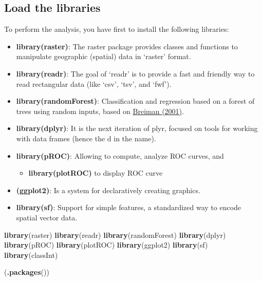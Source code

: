 \documentclass[
]{book}
\newenvironment{Shaded}{\begin{snugshade}}{\end{snugshade}}
\newcommand{\FunctionTok}[1]{\textcolor[rgb]{0.13,0.29,0.53}{\textbf{#1}}}
\newcommand{\NormalTok}[1]{#1}
\providecommand{\tightlist}{%
  \setlength{\itemsep}{0pt}\setlength{\parskip}{0pt}}
\begin{document}
\hypertarget{load-the-libraries-4}{%
\subsection{Load the libraries}\label{load-the-libraries-4}}

To perform the analysis, you have first to install the following libraries:

\begin{itemize}
\item
  \textbf{library(raster)}: The raster package provides classes and functions to manipulate geographic (spatial) data in `raster' format.
\item
  \textbf{library(readr)}: The goal of `readr' is to provide a fast and friendly way to read rectangular data (like `csv', `tsv', and `fwf').
\item
  \textbf{library(randomForest)}: Classification and regression based on a forest of trees using random inputs, based on \href{https://link.springer.com/article/10.1023/A:1010933404324}{Breiman (2001)}.
\item
  \textbf{library(dplyr)}: It is the next iteration of plyr, focused on tools for working with data frames (hence the d in the name).
\item
  \textbf{library(pROC)}: Allowing to compute, analyze ROC curves, and

  \begin{itemize}
  \tightlist
  \item
    \textbf{library(plotROC)} to display ROC curve
  \end{itemize}
\item
  \textbf{(ggplot2)}: Is a system for declaratively creating graphics.
\item
  \textbf{library(sf)}: Support for simple features, a standardized way to encode spatial vector data.
\end{itemize}

\begin{Shaded}
\begin{Highlighting}[]
\FunctionTok{library}\NormalTok{(raster) }
\FunctionTok{library}\NormalTok{(readr) }
\FunctionTok{library}\NormalTok{(randomForest)}
\FunctionTok{library}\NormalTok{(dplyr) }
\FunctionTok{library}\NormalTok{(pROC) }
\FunctionTok{library}\NormalTok{(plotROC) }
\FunctionTok{library}\NormalTok{(ggplot2)  }
\FunctionTok{library}\NormalTok{(sf) }
\FunctionTok{library}\NormalTok{(classInt)}

\NormalTok{(}\FunctionTok{.packages}\NormalTok{())}
\end{Highlighting}
\end{Shaded}
\end{document}
